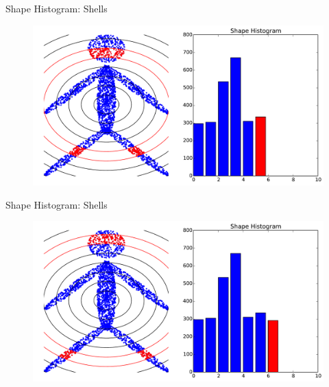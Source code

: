 \documentclass{beamer}
\begin{document}
\begin{frame}{Shape Histogram: Shells}

\begin{figure}[t]
	\centering
    \includegraphics[width=\textwidth]{ShapeHist6.pdf}
\end{figure}

\end{frame}

\begin{frame}{Shape Histogram: Shells}

\begin{figure}[t]
	\centering
    \includegraphics[width=\textwidth]{ShapeHist7.pdf}
\end{figure}

\end{frame}
\end{document}
